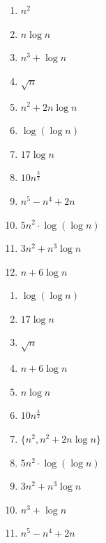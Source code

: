 \documentclass[italian]{article}
\begin{document}
\begin{multicols*}{2}
	\begin{enumerate}[label=\alph*)]
		\item $n^2$
		\item $n\log n$
		\item $n^3 + \log n$
		\item $\sqrt{n}$
		\item $n^2+2n\log n$
		\item $\log(\log n)$
		\item $17\log n$
		\item $10n^{\frac{3}{2}}$
		\item $n^5-n^4+2n$
		\item $5n^2\cdot \log(\log n)$
		\item $3n^2+n^3\log n$
		\item $n+6\log n$ 
	\end{enumerate}
	\columnbreak
		\begin{enumerate}[label=\alph*)]
			\item $\log(\log n)$
			\item $17\log n$
			\item $\sqrt{n}$
			\item $n+6\log n$ 
			\item $n\log n$
			\item $10n^{\frac{3}{2}}$
			\item $\{n^2, n^2+2n\log n \}$
			\item $5n^2\cdot \log(\log n)$
			\item $3n^2+n^3\log n$
			\item $n^3 + \log n$
			\item $n^5-n^4+2n$
		\end{enumerate}
\end{multicols*}
\end{document}
